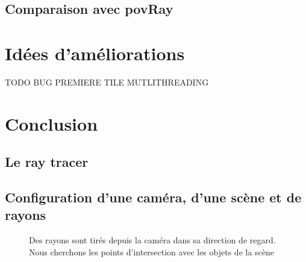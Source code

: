 \documentclass[11pt]{article}
\begin{document}
    \subsection{Comparaison avec povRay}
\section{Idées d'améliorations}
TODO BUG PREMIERE TILE MUTLITHREADING
\section{Conclusion}






\newpage%
\begin{appendices}
	\section{Le ray tracer}
		\subsection{Configuration d'une caméra, d'une scène et de rayons}
		\begin{figure}[h!]

			\caption{Des rayons sont tirés depuis la caméra dans sa direction de regard. Nous cherchons les points d'intersection avec les objets de la scène}
		\end{figure}
		\FloatBarrier
		\label{annexe:repreCamRayon}


\end{appendices}
\end{document}
